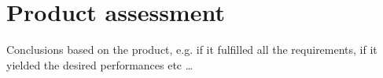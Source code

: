 \section{Product assessment}

Conclusions based on the product, e.g. if it fulfilled all the requirements, if it yielded the desired performances etc \dots